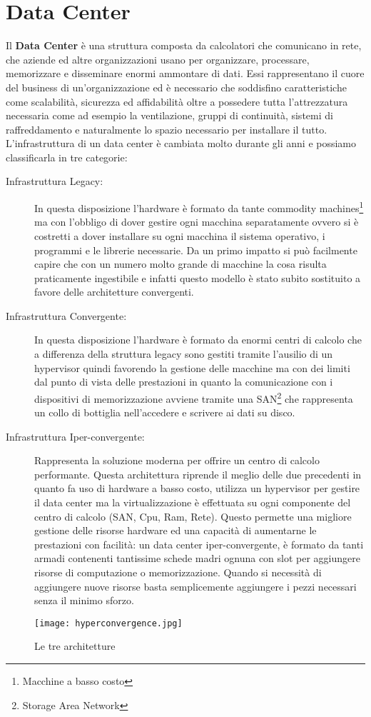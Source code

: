 \section{Data Center}
Il \textbf{Data Center} è una struttura composta da calcolatori che comunicano in rete, che aziende ed altre organizzazioni usano per organizzare, processare, memorizzare e disseminare enormi ammontare di dati. Essi rappresentano il cuore del business di un'organizzazione ed è necessario che soddisfino caratteristiche come scalabilità, sicurezza ed affidabilità oltre a possedere tutta l'attrezzatura necessaria come ad esempio la ventilazione, gruppi di continuità, sistemi di raffreddamento e naturalmente lo spazio necessario per installare il tutto. L'infrastruttura di un data center è cambiata molto durante gli anni e possiamo classificarla in tre categorie: 
\begin{description}
  \item[Infrastruttura Legacy:] In questa disposizione l'hardware è formato da tante commodity machines\footnote{Macchine a basso costo} ma con l'obbligo di dover gestire ogni macchina separatamente ovvero si è costretti a dover installare su ogni macchina il sistema operativo, i programmi e le librerie necessarie. Da un primo impatto si può facilmente capire che con un numero molto grande di macchine la cosa risulta praticamente ingestibile e infatti questo modello è stato subito sostituito a favore delle architetture convergenti.
  \item[Infrastruttura Convergente:] In questa disposizione l'hardware è formato da enormi centri di calcolo che a differenza della struttura legacy sono gestiti tramite l'ausilio di un hypervisor quindi favorendo la gestione delle macchine ma con dei limiti dal punto di vista delle prestazioni in quanto la comunicazione con i dispositivi di memorizzazione avviene tramite una SAN\footnote{Storage Area Network} che rappresenta un collo di bottiglia nell'accedere e scrivere ai dati su disco.
  \item[Infrastruttura Iper-convergente:] Rappresenta la soluzione moderna per offrire un centro di calcolo performante. Questa architettura riprende il meglio delle due precedenti in quanto fa uso di hardware a basso costo, utilizza un hypervisor per gestire il data center ma la virtualizzazione è effettuata su ogni componente del centro di calcolo (SAN, Cpu, Ram, Rete). Questo permette una migliore gestione delle risorse hardware ed una capacità di aumentarne le prestazioni con facilità: un data center iper-convergente, è formato da tanti armadi contenenti tantissime schede madri ognuna con slot per aggiungere risorse di computazione o memorizzazione. Quando si necessità di aggiungere nuove risorse basta semplicemente aggiungere i pezzi necessari senza il minimo sforzo. 
\end{description}
\begin{figure}[H]
  \begin{center}
    \texttt{[image: hyperconvergence.jpg]}
    \caption{Le tre architetture}
    \label{fg:hyperconvergence.jpg}
  \end{center}
\end{figure}
